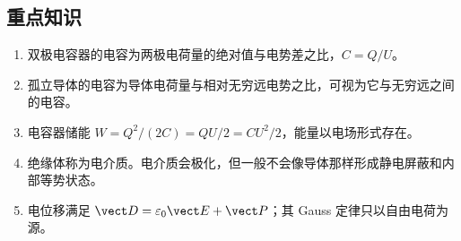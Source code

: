 

\subsection*{重点知识}

\begin{enumerate}[label=\textbf{32.\arabic*},leftmargin=4.2em]
  \item 双极电容器的电容为两极电荷量的绝对值与电势差之比，$C=Q/U$。
  \item 孤立导体的电容为导体电荷量与相对无穷远电势之比，可视为它与无穷远之间的电容。
  \item 电容器储能 $W=Q^2/(2C)=QU/2=CU^2/2$，能量以电场形式存在。
  \item 绝缘体称为电介质。电介质会极化，但一般不会像导体那样形成静电屏蔽和内部等势状态。
  \item 电位移满足 $\vect D=\varepsilon_0\vect E+\vect P$；其 Gauss 定律只以自由电荷为源。
\end{enumerate}
